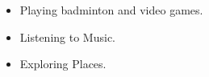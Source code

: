 \smallskip
\begin{itemize}
\item Playing badminton and video games.
\smallskip
\item Listening to Music.
\smallskip
\item Exploring Places.
\end{itemize}


